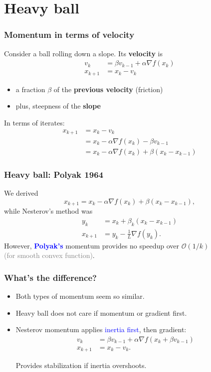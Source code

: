 \documentclass[aspectratio=149]{beamer}
\begin{document}
\section{Heavy ball}%
\label{sec:}

\begin{frame}
  \frametitle{Momentum in terms of velocity}
  Consider a ball rolling down a slope. Its \textbf{velocity} is
  \begin{align}
    v_k &= \beta v_{k-1} + \alpha \nabla f(x_k) \\
    x_{k+1} &= x_k - v_k
  \end{align}
  \begin{itemize}
    \item a fraction $\beta$ of the \textbf{previous velocity} (friction)
    \item plus, steepness of the \textbf{slope}
  \end{itemize}
  In terms of iterates:
  \begin{align}
    x_{k+1} &= x_k - v_k \\
            &= x_k - \alpha \nabla f(x_k) - \beta v_{k-1} \\
            &= x_k - \alpha \nabla f(x_k) + \beta (x_k - x_{k-1})
  \end{align}
\end{frame}

\begin{frame}
  \frametitle{Heavy ball:  Polyak 1964}
  We derived
  \begin{equation}
    x_{k+1} = x_k - \alpha \nabla f(x_k) + \beta (x_k - x_{k-1}),
  \end{equation}
  while Nesterov's method was
  \begin{align}
    y_{k} &= x_k + \beta_k (x_k - x_{k-1}) \\
    x_{k+1} &= y_k - \frac{1}{L} \nabla f(y_k).
  \end{align}
  However, \textcolor{blue}{\textbf{Polyak's}} momentum provides no speedup over $\mathcal{O}(1/k)$ \\
  \textcolor{gray}{(for smooth convex function)}.
\end{frame}


\begin{frame}
  \frametitle{What's the difference?}
  \begin{itemize}
    \item Both types of momentum seem so similar.
    \item Heavy ball does not care if momentum or gradient first.
    \item Nesterov momentum applies \textcolor{blue}{inertia first}, then gradient:
          \begin{align}
            v_k &= \beta v_{k-1} + \alpha \nabla f(x_k + \beta v_{k-1}) \\
            x_{k+1} &= x_k - v_k.
          \end{align}
          \begin{block}{}
            \center
            Provides stabilization if inertia overshoots.
          \end{block}
  \end{itemize}
\end{frame}
\end{document}
